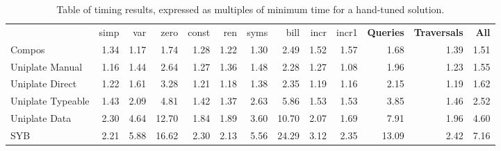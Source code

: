 \documentclass[preprint]{sigplanconf}
\begin{document}
\begin{table}
\caption{Table of timing results, expressed as multiples of minimum time for a hand-tuned solution.}
\label{fig:results}
\vspace{3mm}
\begin{tabular*}{\textwidth}{lrrrrrrrrrrrr}
 & simp & var & zero & const & ren & syms & bill & incr & incr1 & \textbf{Queries} & \textbf{Traversals} & \textbf{All} \\
Compos             &  1.34 &  1.17 &  1.74 &  1.28 &  1.22 &  1.30 &  2.49 &  1.52 &  1.57 &  1.68 &  1.39 &  1.51 \\
Uniplate Manual    &  1.16 &  1.44 &  2.64 &  1.27 &  1.36 &  1.48 &  2.28 &  1.27 &  1.08 &  1.96 &  1.23 &  1.55 \\
Uniplate Direct    &  1.22 &  1.61 &  3.28 &  1.21 &  1.18 &  1.38 &  2.35 &  1.19 &  1.16 &  2.15 &  1.19 &  1.62 \\
Uniplate Typeable  &  1.43 &  2.09 &  4.81 &  1.42 &  1.37 &  2.63 &  5.86 &  1.53 &  1.53 &  3.85 &  1.46 &  2.52 \\
Uniplate Data      &  2.30 &  4.64 & 12.70 &  1.84 &  1.89 &  3.60 & 10.70 &  2.07 &  1.69 &  7.91 &  1.96 &  4.60 \\
SYB            &  2.21 &  5.88 & 16.62 &  2.30 &  2.13 &  5.56 & 24.29 &  3.12 &  2.35 & 13.09 &  2.42 &  7.16 \\
\hline
\end{tabular*}
\end{table}
\end{document}
